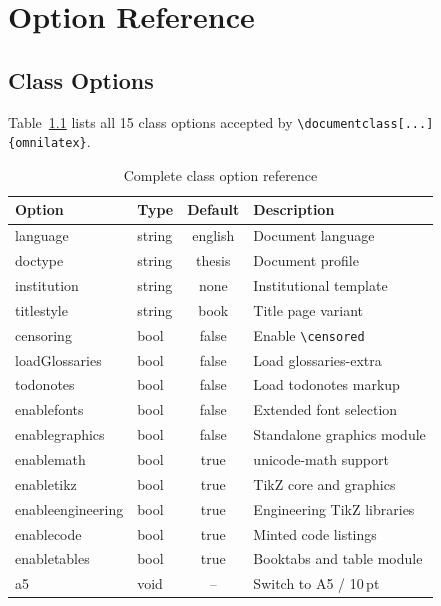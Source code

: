 \chapter{Option Reference}
\label{ch:options}

\section{Class Options}

Table~\ref{tab:option-ref} lists all 15 class options accepted by
\texttt{\textbackslash documentclass[...]\{omnilatex\}}.

\begin{table}[htbp]
  \centering
  \caption{Complete class option reference}
  \label{tab:option-ref}
  \begin{tabular}{@{} l l c p{4.8cm} @{}}
    \toprule
    \textbf{Option} & \textbf{Type} & \textbf{Default} &
    \textbf{Description} \\
    \midrule
    language & string & english & Document language \\
    doctype & string & thesis & Document profile \\
    institution & string & none & Institutional template \\
    titlestyle & string & book & Title page variant \\
    censoring & bool & false & Enable \texttt{\textbackslash censored} \\
    loadGlossaries & bool & false & Load glossaries-extra \\
    todonotes & bool & false & Load todonotes markup \\
    enablefonts & bool & false & Extended font selection \\
    enablegraphics & bool & false & Standalone graphics module \\
    enablemath & bool & true & unicode-math support \\
    enabletikz & bool & true & TikZ core and graphics \\
    enableengineering & bool & true & Engineering TikZ libraries \\
    enablecode & bool & true & Minted code listings \\
    enabletables & bool & true & Booktabs and table module \\
    a5 & void & -- & Switch to A5 / 10\,pt \\
    \bottomrule
  \end{tabular}
\end{table}

